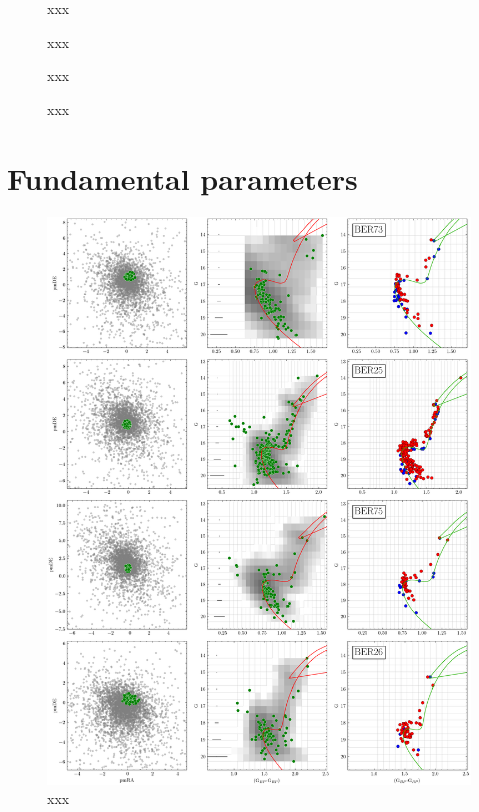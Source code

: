 \documentclass[referee]{aa}
\begin{document}
\begin{appendix}
 \begin{figure}
  \caption{xxx}
  \label{fig:8struct}
 \end{figure}

 \begin{figure}
  \caption{xxx}
  \label{fig:12struct}
 \end{figure}

 \begin{figure}
  \caption{xxx}
  \label{fig:16struct}
 \end{figure}

 \begin{figure}
  \caption{xxx}
  \label{fig:20struct}
 \end{figure}


\section{Fundamental parameters}
\label{app:fundam_params}

 \begin{figure}[t]
  \centering
  \includegraphics[height=.95\textheight]{figs/0_fpars.png}
  \caption{xxx}
  \label{fig:0fpars}
 \end{figure}


\end{appendix}
\end{document}
